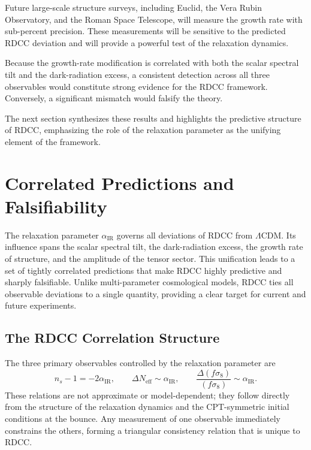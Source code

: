 \documentclass[11pt,a4paper]{article}
\begin{document}
Future large-scale structure surveys, including Euclid, the Vera Rubin Observatory,
and the Roman Space Telescope, will measure the growth rate with sub-percent
precision. These measurements will be sensitive to the predicted RDCC deviation and
will provide a powerful test of the relaxation dynamics.

Because the growth-rate modification is correlated with both the scalar spectral tilt
and the dark-radiation excess, a consistent detection across all three observables would
constitute strong evidence for the RDCC framework. Conversely, a significant mismatch
would falsify the theory.

The next section synthesizes these results and highlights the predictive structure of
RDCC, emphasizing the role of the relaxation parameter as the unifying element of the
framework.

\section{Correlated Predictions and Falsifiability}

The relaxation parameter $\alpha_{\mathrm{IR}}$ governs all deviations of RDCC from
$\Lambda$CDM. Its influence spans the scalar spectral tilt, the dark-radiation excess,
the growth rate of structure, and the amplitude of the tensor sector. This unification
leads to a set of tightly correlated predictions that make RDCC highly predictive and
sharply falsifiable. Unlike multi-parameter cosmological models, RDCC ties all
observable deviations to a single quantity, providing a clear target for current and
future experiments.

\subsection{The RDCC Correlation Structure}

The three primary observables controlled by the relaxation parameter are
\begin{equation}
    n_s - 1 = -2\alpha_{\mathrm{IR}}, \qquad
    \Delta N_{\mathrm{eff}} \sim \alpha_{\mathrm{IR}}, \qquad
    \frac{\Delta(f\sigma_8)}{(f\sigma_8)} \sim \alpha_{\mathrm{IR}}.
\end{equation}
These relations are not approximate or model-dependent; they follow directly from the
structure of the relaxation dynamics and the CPT-symmetric initial conditions at the
bounce. Any measurement of one observable immediately constrains the others, forming
a triangular consistency relation that is unique to RDCC.
\end{document}
